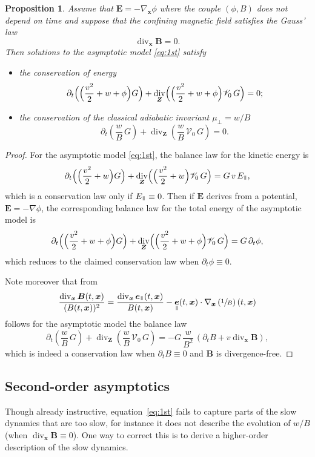 \documentclass[JEP,XML,SOM,Unicode]{cedram}
\let\mathcal\mathscr
\newcommand{\sperp}{{\scriptscriptstyle\perp}}
\let\d\partial
\DeclareMathOperator{\Div}{div}
\theoremstyle{plain}
\newtheorem{proposition}[theorem]{Proposition}
\theoremstyle{definition}
\newcommand{\bpr}{\begin{proposition}}
\newcommand{\epr}{\end{proposition}}
\newcommand\bB{{\boldsymbol B}}
\newcommand\bE{{\boldsymbol E}}
\newcommand\bfx{{\boldsymbol x}}
\newcommand\bfZ{{\boldsymbol Z}}
\newcommand\cV{{\mathcal V}}
\DeclareMathOperator{\beD}{\boldsymbol{e}}
\newcommand\eDpar{\beD_\mypar}
\let\e w
\newcommand\Epar{E_\mypar}
\newcommand{\mypar}{{\mkern3mu\vphantom{\perp}\vrule depth 0pt\mkern2mu\vrule depth 0pt\mkern3mu}}
\begin{document}
\bpr
\label{prop:cons1}
Assume that $\bE=-\nabla_\bfx\phi$ where the couple $(\phi,B)$ does not depend on time and suppose that the confining magnetic field satisfies the Gauss' law
\[
\Div_\bfx\bB= 0.
\]
Then solutions to the asymptotic model \eqref{eq:1st} satisfy
\begin{itemize}
\item the conservation of energy
\[
\d_t \Bigl(\Bigl(\frac{v^2}{2}+\e+\phi\Bigr)G\Bigr)+\Div_{\bfZ} \Bigl(\Bigl(\frac{v^2}{2}+\e+\phi\Bigr)\cV_0\, G\Bigr)
=0;
\]
\item the conservation of the classical adiabatic invariant $\mu_\sperp=\e/B$
\[
\d_t \left(\frac{\e}{B}\,G\right)+\Div_{\bfZ} \left(\frac{\e}{B}\,\cV_0\,G\right)
= 0.
\]
\end{itemize}
\epr
\begin{proof}
For the asymptotic model \eqref{eq:1st}, the balance law for the kinetic energy is
\[
\d_t \Bigl(\Bigl(\frac{v^2}{2}+\e\Bigr)G\Bigr)+\Div_{\bfZ} \Bigl(\Bigl(\frac{v^2}{2}+\e\Bigr)\cV_0\, G\Bigr)
= G\,v\,\Epar,
\]
which is a conservation law only if $\Epar\equiv0$. Then if $\bE$ derives from a potential, $\bE=-\nabla\phi$, the corresponding balance law for the total energy of the asymptotic model is
\[
\d_t \Bigl(\Bigl(\frac{v^2}{2}+\e+\phi\Bigr)G\Bigr)+\Div_{\bfZ} \Bigl(\Bigl(\frac{v^2}{2}+\e+\phi\Bigr) \cV_0\, G\Bigr)
= G\,\d_t\phi,
\]
which reduces to the claimed conservation law when $\d_t\phi\equiv0$.

Note moreover that from
\[
\frac{\Div_\bfx\bB(t,\bfx)}{(B(t,\bfx))^2}=
\frac{\Div_\bfx\eDpar(t,\bfx)}{B(t,\bfx)}
-\eDpar(t,\bfx)\cdot\nabla_\bfx\left(\sfrac1B\right)(t,\bfx)
\]
follows for the asymptotic model the balance law
\[
\d_t \left(\frac{\e}{B}\,G\right)+\Div_{\bfZ} \left(\frac{\e}{B}\,\cV_0\, G\right)
=-G\,\frac{\e}{B^2}\,(\d_tB+v\Div_\bfx\bB),
\]
which is indeed a conservation law when $\d_tB\equiv0$ and $\bB$ is divergence-free.
\end{proof}

\subsection{Second-order asymptotics}

Though already instructive, equation~\eqref{eq:1st} fails to capture parts of the slow dynamics that are too slow, for instance it does not describe the evolution of $\e/B$ (when $\Div_\bfx\bB\equiv0$). One way to correct this is to derive a higher-order description of the slow dynamics.
\end{document}

